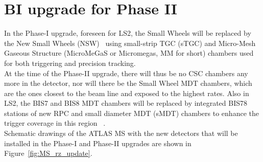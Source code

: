 \section {BI upgrade for Phase II}
In the Phase-I upgrade, foreseen for LS2, the Small Wheels will be replaced by the New Small Wheels (NSW)~\cite{NSW} using small-strip TGC (sTGC) and Micro-Mesh Gaseous Structure
(MicroMeGaS or Micromegas, MM for short) chambers used for both triggering and precision tracking.\\
At the time of the Phase-II upgrade, there will thus be no CSC chambers
any more in the detector, nor will there be the Small Wheel MDT chambers, which are the ones closest to the beam line and exposed to the highest rates. Also in LS2, the BIS7 and
BIS8 MDT chambers will be replaced by integrated BIS78 stations of new RPC and small diameter MDT (sMDT) chambers to enhance the trigger coverage in this region ~\cite{BIS78}.\\
Schematic drawings of the ATLAS MS with the new detectors that will be installed in the Phase-I and Phase-II upgrades are shown in Figure~\ref{fig:MS_rz_update}.\\
